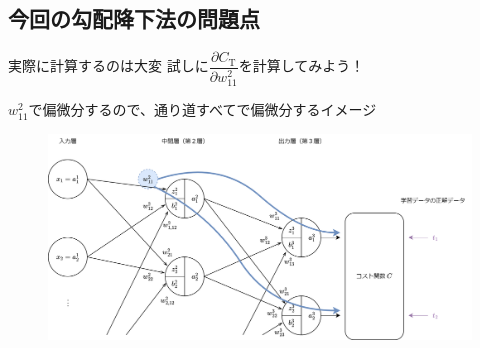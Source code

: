 \documentclass[dvipdfmx,aspectratio=169]{beamer}
\begin{document}
	\subsection{今回の勾配降下法の問題点}
	\begin{frame}{実際に計算するのは大変}
		試しに$ \dfrac{\partial C_\mathrm{T}}{\partial w^2_{11}} $を計算してみよう！
		
		$ w^2_{11} $で偏微分するので、通り道すべてで偏微分するイメージ
		\begin{figure}
			\centering
			\includegraphics[width=0.75\linewidth]{img/relationships-between-varialbes-when-using-the-chain-rule}
		\end{figure}
	\end{frame}
\end{document}
